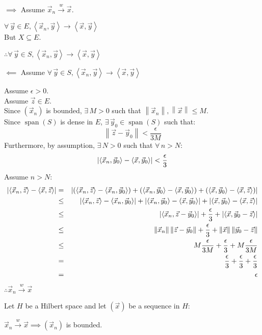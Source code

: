 \documentclass[letterpaper,12pt,fleqn]{article}
\newcommand{\vx}{\vec{x}}
\newcommand{\vy}{\vec{y}}
\newcommand{\vz}{\vec{z}}
\newcommand{\norm}[1]{\left\|#1\right\|}
\newcommand{\inner}[1]{\left<#1\right>}
\newcommand{\weak}{\overset{w}{\longrightarrow}}
\newcommand{\e}{\epsilon}
\DeclareMathOperator{\spn}{span}
\begin{document}
\begin{theproof}
  \listbreak
  \begin{description}
  \item $\implies$ Assume $\vx_n\weak\vx$.

    $\forall\,\vy\in E,\inner{\vx_n,\vy}\to\inner{\vx,\vy}$ \\
    But $X\subseteq E$.
    
    $\therefore\forall\,\vy\in S,\inner{\vx_n,\vy}\to\inner{\vx,\vy}$

  \item $\impliedby$ Assume $\forall\,\vy\in S,\inner{\vx_n,\vy}\to
    \inner{\vx,\vy}$

    Assume $\e>0$. \\
    Assume $\vz\in E$. \\
    Since $(\vx_n)$ is bounded, $\exists\,M>0$ such that
    $\norm{\vx_n},\norm{\vx}\le M$. \\
    Since $\spn(S)$ is dense in $E$, $\exists\,\vy_0\in\spn(S)$ such that:
    \[\norm{\vz-\vy_0}<\frac{\e}{3M}\]
    Furthermore, by assumption, $\exists\,N>0$ such that $\forall\,n>N$:
    \[\abs{\inner{\vx_n,\vy_0}-\inner{\vx,\vy_0}}<\frac{\e}{3}\]
    Assume $n>N$:
    \begin{eqnarray*}
      \abs{\inner{\vx_n,\vz}-\inner{\vx,\vz}} &=&
      \abs{(\inner{\vx_n,\vz}-\inner{\vx_n,\vy_0})+
        (\inner{\vx_n,\vy_0}-\inner{\vx,\vy_0})+
        (\inner{\vx,\vy_0}-\inner{\vx,\vz})} \\
      &\le& \abs{\inner{\vx_n,\vz}-\inner{\vx_n,\vy_0}}+
      \abs{\inner{\vx_n,\vy_0}-\inner{\vx,\vy_0}}+
      \abs{\inner{\vx,\vy_0}-\inner{\vx,\vz}} \\
      &\le& \abs{\inner{\vx_n,\vz-\vy_0}}+\frac{\e}{3}+
      \abs{\inner{\vx,\vy_0-\vz}} \\
      &\le& \norm{\vx_n}\norm{\vz-\vy_0}+\frac{\e}{3}+
      \norm{\vx}\norm{\vy_0-\vz} \\
      &\le& M\frac{\e}{3M}+\frac{\e}{3}+M\frac{\e}{3M} \\
      &=& \frac{\e}{3}+\frac{\e}{3}+\frac{\e}{3} \\
      &=& \e
    \end{eqnarray*}
    $\therefore\vx_n\weak\vx$
  \end{description}
\end{theproof}

\begin{theorem}
  Let $H$ be a Hilbert space and let $(\vx)$ be a sequence in $H$:

  \qquad$\vx_n\weak\vx\implies(\vx_n)$ is bounded.
\end{theorem}
\end{document}
